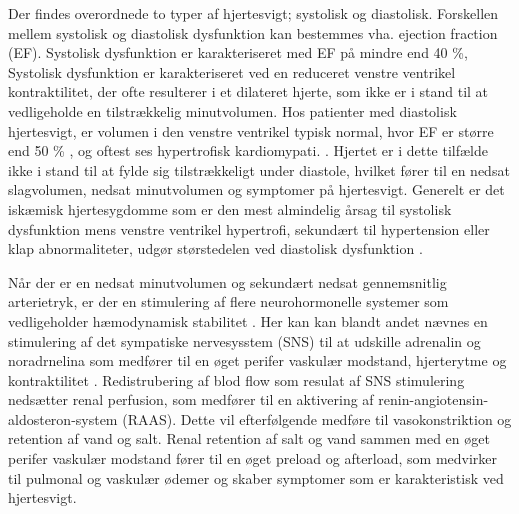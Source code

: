 Der findes overordnede to typer af hjertesvigt; systolisk og diastolisk. Forskellen mellem systolisk og diastolisk dysfunktion kan bestemmes vha. ejection fraction (EF). Systolisk dysfunktion er karakteriseret med EF på mindre end 40 \%, \citep{Consensus1999}\citep{Fletcher2001} Systolisk dysfunktion er karakteriseret ved en reduceret venstre ventrikel kontraktilitet, der ofte resulterer i et dilateret hjerte, som ikke er i stand til at vedligeholde en tilstrækkelig minutvolumen. \citep{Mudd2008} \citep{Consensus1999}\citep{Fletcher2001} Hos patienter med diastolisk hjertesvigt, er volumen i den venstre ventrikel typisk normal, hvor EF er større end 50 \% \citep{Ruzumna1996},  og oftest ses hypertrofisk kardiomypati. \citep{Braunwald2013}. Hjertet er i dette tilfælde ikke i stand til at fylde sig tilstrækkeligt under diastole, hvilket fører til en nedsat slagvolumen, nedsat minutvolumen og symptomer på hjertesvigt. \citep{Ruzumna1996} \citep{Willerson1995}\citep{Fletcher2001} Generelt er det iskæmisk hjertesygdomme som er den mest almindelig årsag til systolisk dysfunktion mens venstre ventrikel hypertrofi, sekundært til hypertension eller klap abnormaliteter, udgør størstedelen ved diastolisk dysfunktion \citep{Mcalister1997}. 

Når der er en nedsat minutvolumen og sekundært nedsat gennemsnitlig arterietryk, er der en stimulering af flere neurohormonelle systemer som vedligeholder hæmodynamisk stabilitet \citep{Mccance1998}. Her kan kan blandt andet nævnes en stimulering af det sympatiske nervesysstem (SNS) til at udskille adrenalin og noradrnelina som medfører til en øget perifer vaskulær modstand, hjerterytme og kontraktilitet \citep{Fletcher2001}. Redistrubering af blod flow som resulat af SNS stimulering nedsætter renal perfusion, som medfører til en aktivering af renin-angiotensin-aldosteron-system (RAAS). Dette vil efterfølgende medføre til vasokonstriktion og retention af vand og salt. \citep{Mccance1998} Renal retention af salt og vand sammen med en øget perifer vaskulær modstand fører til en øget preload og afterload, som medvirker til pulmonal og vaskulær ødemer og skaber symptomer som er karakteristisk ved hjertesvigt. \citep{Mccance1998}

